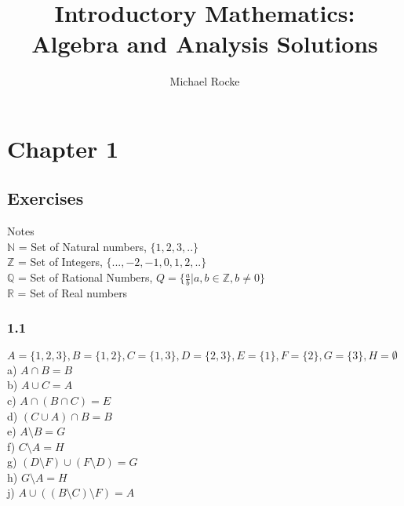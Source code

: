 \documentclass[]{report}
\title{Introductory Mathematics: Algebra and Analysis Solutions}
\author{Michael Rocke}
\begin{document}
\maketitle

\section{Chapter 1}

\subsection{Exercises}
Notes \\

$\mathbb{N} $ = Set of Natural numbers, $ \{1, 2, 3, .. \}$ \\

$\mathbb{Z} $ = Set of Integers, $ \{..., -2, -1, 0, 1, 2, .. \}$ \\

$\mathbb{Q} $ = Set of Rational Numbers, $ Q = \{\frac{a}{b} | a,b \in \mathbb{Z}, b \ne 0 \} $ \\

$\mathbb{R} $ = Set of Real numbers

\subsubsection{1.1}
$ A = \{1,2,3\} , B = \{1, 2\}, C=\{1, 3\}, D=\{2, 3\}, E=\{1\}, F=\{2\}, G=\{3\}, H=\emptyset$ \\


a) $A \cap B = B $ \\

b) $A \cup C = A $ \\

c) $A \cap (B \cap C) = E $ \\

d) $(C \cup A) \cap B  = B $ \\

e) $ A \setminus B = G $ \\

f) $ C \setminus A = H $ \\

g) $ (D \setminus F) \cup (F \setminus D)  = G$ \\

h) $ G \setminus A = H$ \\

j) $ A \cup ((B \setminus C) \setminus F)  = A$\\
\end{document}

